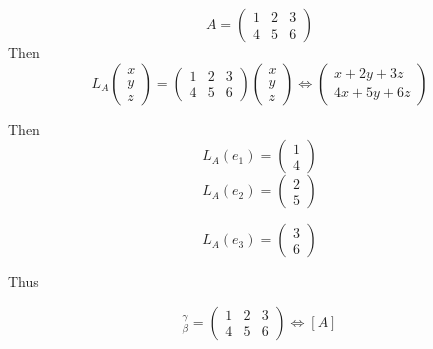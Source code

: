 \documentclass{article}
\newtheorem{one minute paper}[theorem]{One Minute Paper}
\begin{document}
\begin{equation}
    A = \begin{pmatrix}
        1 & 2 & 3 \\
        4 & 5 & 6
    \end{pmatrix}
\end{equation}
Then 
\begin{equation}
    L_A\begin{pmatrix}
        x \\
        y \\
        z
    \end{pmatrix} = \begin{pmatrix}
        1 & 2 & 3 \\
        4 & 5 & 6
    \end{pmatrix}\begin{pmatrix}
        x \\
        y \\
        z
    \end{pmatrix} \iff \begin{pmatrix}
        x + 2y + 3z \\
        4x + 5y + 6z
    \end{pmatrix}
\end{equation}

Then 
\begin{equation}
    L_A(e_1) = \begin{pmatrix}
        1 \\
        4
    \end{pmatrix}
\end{equation}
\begin{equation}
    L_A(e_2) = \begin{pmatrix}
        2 \\
        5
    \end{pmatrix}
\end{equation}

\begin{equation}
    L_A(e_3) = \begin{pmatrix}
        3 \\
        6
    \end{pmatrix}
\end{equation}

Thus 

\begin{equation}
    [L_A]_\beta^\gamma = \begin{pmatrix}
        1 & 2 & 3 \\
        4 & 5 & 6
    \end{pmatrix} \iff [A]
\end{equation}
\end{document}
